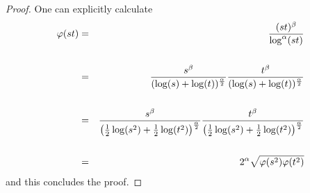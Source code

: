 \documentclass[10pt,a4paper]{amsart}
\begin{document}
\begin{proof} One can explicitly calculate
\begin{eqnarray*}
  \varphi(st)&=& {\frac{(st)^\beta}{\log^{\alpha}(st)}}\cr\cr 
  &=&\frac{s^\beta}{(\log(s)+\log(t))^{\frac{\alpha}{2}}}\frac{t^\beta}{(\log(s)+\log(t))^{\frac{\alpha}{2}}}\cr\cr 
  &=&\frac{s^\beta}{\left(\frac12\log(s^2)+\frac12\log(t^2)\right)^{\frac{\alpha}{2}}}\frac{t^\beta}{\left(\frac12\log(s^2)+\frac12\log(t^2)\right)^{\frac{\alpha}{2}}}\cr\cr 
  &=&2^{\alpha}\sqrt{\varphi(s^2)\varphi(t^2)} 
\end{eqnarray*}
and this concludes the proof.
\end{proof}
\end{document}
